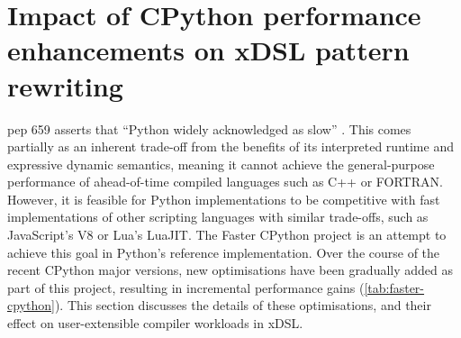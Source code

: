 \chapter{Impact of CPython performance enhancements on xDSL pattern rewriting}
\label{chap:impact-cpython-pattern-rewriting}

\acf{pep} 659 asserts that ``Python widely acknowledged as slow'' \cite{pep659}.
This comes partially as an inherent trade-off from the benefits of its interpreted runtime and expressive dynamic semantics, meaning it cannot achieve the general-purpose performance of ahead-of-time compiled languages such as C++ or FORTRAN. However, it is feasible for Python implementations to be competitive with fast implementations of other scripting languages with similar trade-offs, such as JavaScript's V8 or Lua's LuaJIT. The Faster CPython project is an attempt to achieve this goal in Python's reference implementation. Over the course of the recent CPython major versions, new optimisations have been gradually added as part of this project, resulting in incremental performance gains (\autoref{tab:faster-cpython}).
This section discusses the details of these optimisations, and their effect on user-extensible compiler workloads in xDSL.


